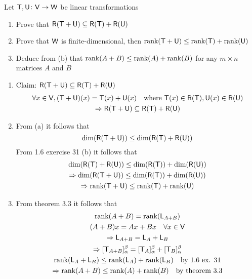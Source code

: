 Let $\mathsf{T},\mathsf{U}\colon \mathsf{V} \to \mathsf{W}$ be linear transformations
\begin{enumerate}
\item Prove that $\mathsf{R}(\mathsf{T} +\mathsf{U}) \subseteq \mathsf{R}(\mathsf{T}) +
  \mathsf{R}(\mathsf{U})$
\item Prove that $\mathsf{W}$ is finite-dimensional, then $\text{rank}({\mathsf{T}+\mathsf{U}}) \leq
  \text{rank}({\mathsf{T}}) +\text{rank}({\mathsf{U}})$
\item Deduce from (b) that $\text{rank}({A+B}) \leq \text{rank}({A}) +\text{rank}({B})$ for
  any $m\times n$ matrices $A$ and $B$
\end{enumerate}
\begin{enumerate}
\item Claim: $\mathsf{R}(\mathsf{T} +\mathsf{U}) \subseteq \mathsf{R}(\mathsf{T}) +
  \mathsf{R}(\mathsf{U})$
\begin{gather}
\forall x \in \mathsf{V}, (\mathsf{T}+\mathsf{U})(x) = \mathsf{T}(x) +\mathsf{U}(x)\quad \text{where } \mathsf{T}(x)\in
\mathsf{R}(\mathsf{T}), \mathsf{U}(x) \in \mathsf{R}(\mathsf{U})\\
\Rightarrow \mathsf{R}(\mathsf{T} +\mathsf{U}) \subseteq \mathsf{R}(\mathsf{T}) +
  \mathsf{R}(\mathsf{U})
\end{gather}
\item From (a) it follows that
\begin{equation}
\text{dim}({\mathsf{R}(\mathsf{T}+\mathsf{U})}) \leq \text{dim}({\mathsf{R}(\mathsf{T}) +\mathsf{R}(\mathsf{U})})
\end{equation}
From 1.6 exercise 31 (b) it follows that
\begin{gather}
\text{dim}({\mathsf{R}(\mathsf{T})+\mathsf{R}(\mathsf{U})}) \leq \text{dim}({\mathsf{R}(\mathsf{T})})
+\text{dim}({\mathsf{R}(\mathsf{U})})\\
\Rightarrow \text{dim}({\mathsf{R}(\mathsf{T}+\mathsf{U})})\leq \text{dim}({\mathsf{R}(\mathsf{T})})
+\text{dim}({\mathsf{R}(\mathsf{U})})\\
\Rightarrow \text{rank}({\mathsf{T}+\mathsf{U}}) \leq
  \text{rank}({\mathsf{T}}) +\text{rank}({\mathsf{U}})
\end{gather}
\item From theorem 3.3 it follows that
\begin{gather}
\text{rank}({A+B}) =\text{rank}({\mathsf{L}_{A+B}})\\
(A+B)x = Ax+Bx\quad \forall x \in \mathsf{V}\\
\Rightarrow \mathsf{L}_{A+B} = \mathsf{L}_A + \mathsf{L}_B\\
\Rightarrow [\mathsf{T}_{A+B}]_\alpha^\beta = [\mathsf{T}_A]_\alpha^\beta +
[\mathsf{T}_B]_\alpha^\beta\\
\text{rank}({\mathsf{L}_A+\mathsf{L}_B}) \leq \text{rank}({\mathsf{L}_A}) +
\text{rank}({\mathsf{L}_B}) \quad \text{by 1.6 ex. 31}\\
\Rightarrow \text{rank}({A+B}) \leq \text{rank}({A}) + \text{rank}({B}) \quad \text{by theorem 3.3}
\end{gather}
\end{enumerate}
